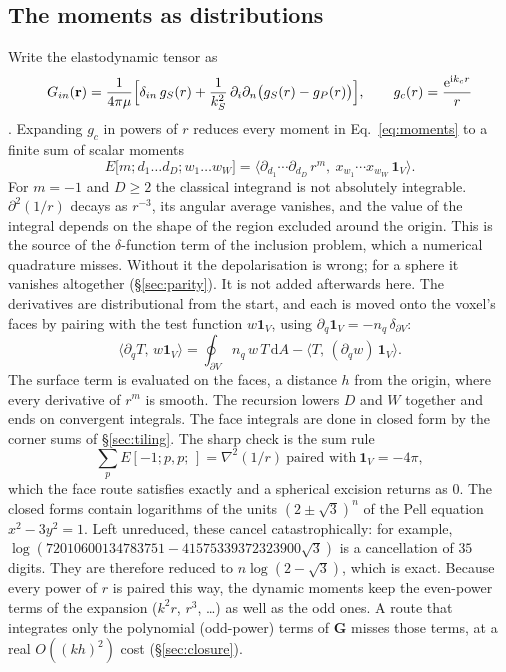 \documentclass[extra,mreferee]{gji}
\newcommand{\bG}{\mathbf{G}}
\begin{document}
\subsection{The moments as distributions}\label{sec:distributions}

Write the elastodynamic tensor as
\begin{equation}\label{eq:Gdecomp}
  G_{in}(\mathbf r)=\frac{1}{4\pi\mu}\Bigl[\delta_{in}\,g_{S}(r)
  +\frac{1}{k_S^2}\,\partial_i\partial_n\bigl(g_S(r)-g_P(r)\bigr)\Bigr],
  \qquad g_{c}(r)=\frac{\mathrm{e}^{\mathrm{i}k_cr}}{r}
\end{equation}
\citep{Kupradze1963,Aki2002}. Expanding $g_c$ in powers of $r$ reduces every moment in
Eq.~\eqref{eq:moments} to a finite sum of scalar moments
\begin{equation}\label{eq:Emoment}
  E\bigl[m;d_1\ldots d_D;w_1\ldots w_W\bigr]
  =\bigl\langle \partial_{d_1}\!\cdots\partial_{d_D}\,r^m,\ x_{w_1}\!\cdots x_{w_W}\,\mathbf 1_V\bigr\rangle .
\end{equation}
For $m=-1$ and $D\ge2$ the classical integrand is not absolutely integrable. $\partial^2(1/r)$
decays as $r^{-3}$, its angular average vanishes, and the value of the integral depends on the
shape of the region excluded around the origin. This is the source of the $\delta$-function term
of the inclusion problem, which a numerical quadrature misses. Without it the depolarisation is
wrong; for a sphere it vanishes altogether (\S\ref{sec:parity}). It is not added afterwards here. The derivatives are
distributional from the start, and each is moved onto the voxel's faces by pairing with the test
function $w\mathbf 1_V$, using $\partial_q\mathbf 1_V=-n_q\,\delta_{\partial V}$:
\begin{equation}\label{eq:peel}
  \bigl\langle \partial_qT,\,w\mathbf 1_V\bigr\rangle
  =\oint_{\partial V} n_q\,w\,T\,\mathrm{d}A-\bigl\langle T,\,(\partial_qw)\,\mathbf 1_V\bigr\rangle .
\end{equation}
The surface term is evaluated on the faces, a distance $h$ from the origin, where every
derivative of $r^m$ is smooth. The recursion lowers $D$ and $W$ together and ends on convergent
integrals. The face integrals are done in closed form by the corner sums of \S\ref{sec:tiling}. The
sharp check is the sum rule
\begin{equation}\label{eq:sumrule}
  \textstyle\sum_pE[-1;p,p;\,]=\nabla^2(1/r)\ \text{paired with}\ \mathbf 1_V=-4\pi ,
\end{equation}
which the face route satisfies exactly and a spherical excision returns as $0$. The closed forms
contain logarithms of the units $(2\pm\sqrt3)^n$ of the Pell equation $x^2-3y^2=1$. Left
unreduced, these cancel catastrophically: for example, $\log(72010600134783751-41575339372323900\sqrt3)$
is a cancellation of $35$ digits. They are therefore reduced to $n\log(2-\sqrt3)$, which is
exact. Because every power of $r$ is paired this way, the dynamic moments keep the even-power terms
of the expansion ($k^2r$, $r^3$, \dots) as well as the odd ones. A route that integrates only the
polynomial (odd-power) terms of $\bG$ misses those terms, at a real $O((kh)^2)$ cost
(\S\ref{sec:closure}).
\end{document}
